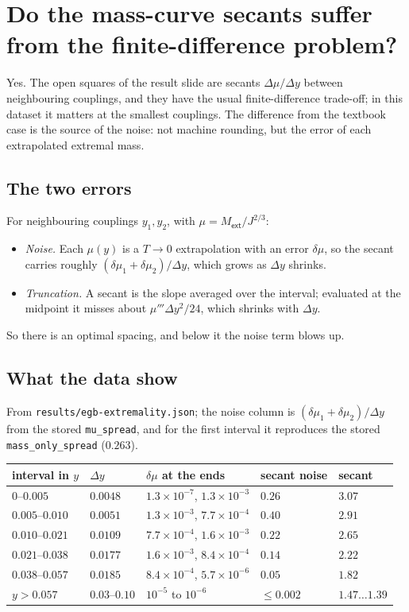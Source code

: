 \documentclass[11pt,a4paper]{article}
\newcommand{\q}[1]{\subsection*{\color{accent}#1}}
\newcommand{\ext}{\mathsf{ext}}
\begin{document}
\section{Do the mass-curve secants suffer from the finite-difference problem?}
\label{sec:secants}

\noindent Yes. The open squares of the result slide are secants
$\Delta\mu/\Delta y$ between neighbouring couplings, and they have the usual
finite-difference trade-off; in this dataset it matters at the smallest
couplings. The difference from the textbook case is the source of the noise:
not machine rounding, but the error of each extrapolated extremal mass.

\q{The two errors}

For neighbouring couplings $y_1,y_2$, with $\mu=M_\ext/J^{2/3}$:
\begin{itemize}\itemsep3pt
  \item \emph{Noise.} Each $\mu(y)$ is a $T\to0$ extrapolation with an error
  $\delta\mu$, so the secant carries roughly
  $(\delta\mu_1+\delta\mu_2)/\Delta y$, which grows as $\Delta y$ shrinks.
  \item \emph{Truncation.} A secant is the slope averaged over the interval;
  evaluated at the midpoint it misses about $\mu'''\Delta y^2/24$, which shrinks
  with $\Delta y$.
\end{itemize}
So there is an optimal spacing, and below it the noise term blows up.

\q{What the data show}

From \texttt{results/egb-extremality.json}; the noise column is
$(\delta\mu_1+\delta\mu_2)/\Delta y$ from the stored \texttt{mu\_spread}, and for
the first interval it reproduces the stored \texttt{mass\_only\_spread}
($0.263$).

\begin{center}\small
\begin{tabular}{@{}lllll@{}}
\toprule
interval in $y$ & $\Delta y$ & $\delta\mu$ at the ends & secant noise & secant \\
\midrule
$0$--$0.005$       & $0.0048$ & $1.3\times10^{-7}$, $1.3\times10^{-3}$ & $\mathbf{0.26}$ & $3.07$ \\
$0.005$--$0.010$   & $0.0051$ & $1.3\times10^{-3}$, $7.7\times10^{-4}$ & $\mathbf{0.40}$ & $2.91$ \\
$0.010$--$0.021$   & $0.0109$ & $7.7\times10^{-4}$, $1.6\times10^{-3}$ & $0.22$ & $2.65$ \\
$0.021$--$0.038$   & $0.0177$ & $1.6\times10^{-3}$, $8.4\times10^{-4}$ & $0.14$ & $2.22$ \\
$0.038$--$0.057$   & $0.0185$ & $8.4\times10^{-4}$, $5.7\times10^{-6}$ & $0.05$ & $1.82$ \\
$y>0.057$          & $0.03$--$0.10$ & $10^{-5}$ to $10^{-6}$ & $\le0.002$ & $1.47\ldots1.39$ \\
\bottomrule
\end{tabular}
\end{center}
\end{document}
